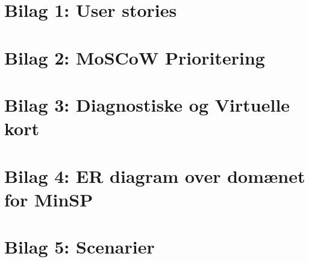 \section{Bilag 1: User stories}

\newpage
\section{Bilag 2: MoSCoW Prioritering}

\section{Bilag 3: Diagnostiske og Virtuelle kort}

\section{Bilag 4: ER diagram over domænet for MinSP}

\section{Bilag 5: Scenarier}



